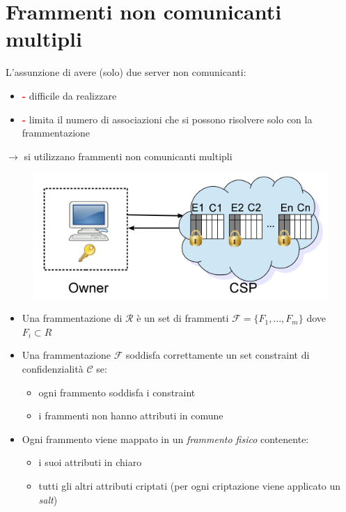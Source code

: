 \documentclass{report}
\begin{document}
\newpage
\section{Frammenti non comunicanti multipli}
L'assunzione di avere (solo) due server non comunicanti:
\begin{itemize}
    \item \textcolor{red}{\textbf{-}} difficile da realizzare 
    \item \textcolor{red}{\textbf{-}} limita il numero di associazioni che si possono risolvere solo con la frammentazione
\end{itemize}

$\rightarrow$ si utilizzano frammenti non comunicanti multipli

\begin{figure}[ht]
    \centering
    \includegraphics[width=0.7\linewidth]{images/encryption-fragmentation/multi-frag.png}
\end{figure}

\begin{itemize}
    \item Una frammentazione di $\mathcal{R}$ è un set di frammenti 
    $\mathcal{F} = \{ F_1, \dots, F_m\}$ dove $F_i \subset R$ 
    \item Una frammentazione $\mathcal{F}$ soddisfa correttamente un set constraint
    di confidenzialità $\mathcal{C}$ se:
    \begin{itemize}
        \item ogni frammento soddisfa i constraint
        \item i frammenti non hanno attributi in comune
    \end{itemize}
    \item Ogni frammento viene mappato in un \textit{frammento fisico} contenente:
    \begin{itemize}
        \item i suoi attributi in chiaro
        \item tutti gli altri attributi criptati (per ogni criptazione viene applicato un \textit{salt})
    \end{itemize}
\end{itemize}
\end{document}
